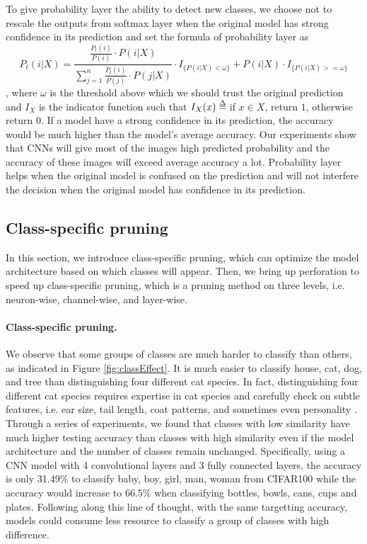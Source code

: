 \documentclass[pageno]{jpaper}
\def\delequal{\mathrel{\ensurestackMath{\stackon[1pt]{=}{\scriptstyle\Delta}}}}
\begin{document}
To give probability layer the ability to detect new classes, we choose not to rescale the outputs from softmax layer when the original model has strong confidence in its prediction and set the formula of probability layer as
\begin{equation} \label{eq: recover}
    P_t(i|X) = \frac{\frac{P_t(i)}{P(i)} \cdot P(i|X)}{\sum_{j=1}^n \frac{P_t(i)}{P(j)} \cdot P(j|X)} \cdot I_{\{P(i|X) < \omega\}} + P(i|X) \cdot I_{\{P(i|X) >= \omega\}} 
\end{equation}
, where $\omega$ is the threshold above which we should trust the original prediction and $I_X$ is the indicator function such that
$I_X(x) \delequal \; $if $x\in X$, return $1$, otherwise return $0$.
If a model have a strong confidence in its prediction, the accuracy would be much higher than the model's average accuracy. Our experiments show that CNNs will give most of the images high predicted probability and the accuracy of these images will exceed average accuracy a lot. Probability layer helps when the original model is confused on the prediction and will not interfere the decision when the original model has confidence in its prediction.




\subsection{Class-specific pruning}
In this section, we introduce class-specific pruning, which can optimize the model architecture based on which classes will appear. Then, we bring up perforation to speed up class-specific pruning, which is a pruning method on three levels, i.e. neuron-wise, channel-wise, and layer-wise.


\paragraph{Class-specific pruning.} 
We observe that some groups of classes are much harder to classify than others, as indicated in Figure \ref{fig:classEffect}. It is much easier to classify house, cat, dog, and tree than distinguishing four different cat species. In fact, distinguishing four different cat species requires expertise in cat species and carefully check on subtle features, i.e. ear size, tail length, coat patterns, and sometimes even personality \cite{cat2018}. Through a series of experiments, we found that classes with low similarity have much higher testing accuracy than classes with high similarity even if the model architecture and the number of classes remain unchanged. Specifically, using a CNN model with 4 convolutional layers and 3 fully connected layers, the accuracy is only 31.49\% to classify baby, boy, girl, man, woman from CIFAR100 while the accuracy would increase to 66.5\% when classifying bottles, bowls, cans, cups and plates. Following along this line of thought, with the same targetting accuracy, models could consume less resource to classify a group of classes with high difference. 
\end{document}
